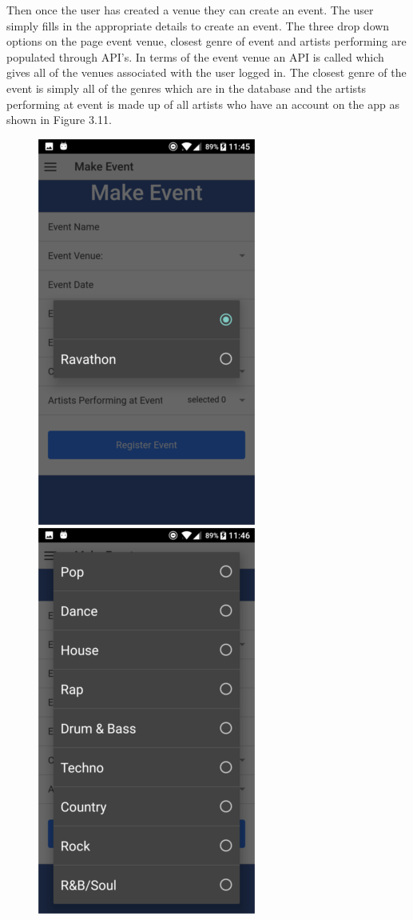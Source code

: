 Then once the user has created a venue they can create an event. The user simply fills in the appropriate details to create an event. The three drop down options on the page event venue, closest genre of event and artists performing are populated through API's. In terms of the event venue an API is called which gives all of the venues associated with the user logged in. The closest genre of the event is simply all of the genres which are in the database and the artists performing at event is made up of all artists who have an account on the app as shown in Figure 3.11.
\begin{center}
\begin{figure}[H]
\includegraphics[scale=0.5]{images/sc16}
\includegraphics[scale=0.5]{images/sc17}

\end{figure}
\end{center}
